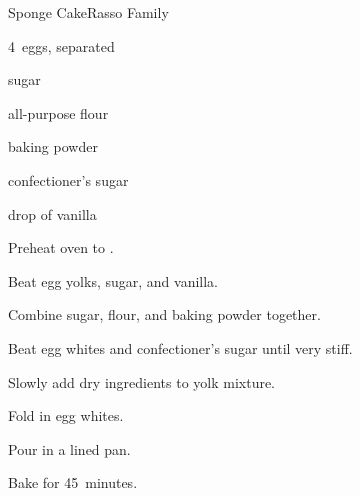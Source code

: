 \begin{recipe}{Sponge Cake}{Rasso Family}{}

\begin{ingredients}
\item 4~eggs, separated
\item {} sugar
\item {} all-purpose flour
\item {} baking powder
\item \tp{\half} confectioner's sugar
\item drop of vanilla
\end{ingredients}

\begin{directions}
\item Preheat oven to .
\item Beat egg yolks, sugar, and vanilla.
\item Combine sugar, flour, and baking powder together.
\item Beat egg whites and confectioner's sugar until very stiff.
\item Slowly add dry ingredients to yolk mixture.
\item Fold in egg whites.
\item Pour in a lined pan.
\item Bake for 45~minutes.
\end{directions}

\end{recipe}
